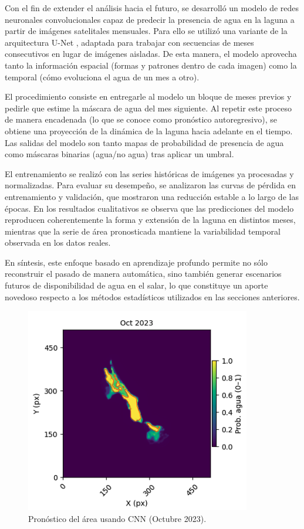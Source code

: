 Con el fin de extender el análisis hacia el futuro, se desarrolló un modelo de redes neuronales convolucionales capaz de predecir la presencia de agua en la laguna a partir de imágenes satelitales mensuales. Para ello se utilizó una variante de la arquitectura U-Net \parencite{ronneberger2015unet}, adaptada para trabajar con secuencias de meses consecutivos en lugar de imágenes aisladas. De esta manera, el modelo aprovecha tanto la información espacial (formas y patrones dentro de cada imagen) como la temporal (cómo evoluciona el agua de un mes a otro).

El procedimiento consiste en entregarle al modelo un bloque de meses previos y pedirle que estime la máscara de agua del mes siguiente. Al repetir este proceso de manera encadenada (lo que se conoce como pronóstico autoregresivo), se obtiene una proyección de la dinámica de la laguna hacia adelante en el tiempo. Las salidas del modelo son tanto mapas de probabilidad de presencia de agua como máscaras binarias (agua/no agua) tras aplicar un umbral.

El entrenamiento se realizó con las series históricas de imágenes ya procesadas y normalizadas. Para evaluar su desempeño, se analizaron las curvas de pérdida en entrenamiento y validación, que mostraron una reducción estable a lo largo de las épocas. En los resultados cualitativos se observa que las predicciones del modelo reproducen coherentemente la forma y extensión de la laguna en distintos meses, mientras que la serie de área pronosticada mantiene la variabilidad temporal observada en los datos reales.

En síntesis, este enfoque basado en aprendizaje profundo permite no sólo reconstruir el pasado de manera automática, sino también generar escenarios futuros de disponibilidad de agua en el salar, lo que constituye un aporte novedoso respecto a los métodos estadísticos utilizados en las secciones anteriores.

\begin{figure}[H]
    \centering
    \includegraphics[scale=0.80]{Figures/forecast_cnn1.png}
    \caption{Pronóstico del área usando CNN (Octubre 2023).}
    \label{fig:forecast_cnn}
\end{figure}




